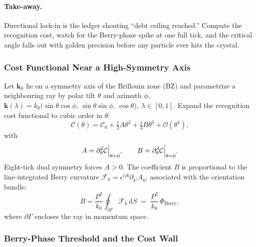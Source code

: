 \documentclass[11pt,oneside]{book}
\begin{document}
\paragraph{Take-away.}
Directional lock-in is the ledger shouting “debt ceiling reached.”
Compute the recognition cost, watch for the Berry-phase spike at one
full tick, and the critical angle falls out with golden precision
before any particle ever hits the crystal.



\subsubsection{Cost Functional Near a High-Symmetry Axis}
\label{ss:lockin-cost-expansion}

Let $\mathbf{k}_{0}$ lie on a symmetry axis of the Brillouin zone
(BZ) and parametrize a neighbouring ray by polar tilt
$\theta$ and azimuth $\phi$,
\(
   \mathbf{k}(\lambda)
   = k_{0}\!\bigl(
       \sin\theta\cos\phi,\,
       \sin\theta\sin\phi,\,
       \cos\theta
     \bigr),
     \ \lambda\in[0,1].
\)
Expand the recognition cost functional to cubic order in $\theta$:
\begin{equation}
   \mathcal C(\theta)
   = \mathcal C_{0}
     + \tfrac12A\theta^{2}
     + \tfrac13B\theta^{3}
     + \mathcal O(\theta^{4}),
   \label{eq:Cexp}
\end{equation}
with
\[
   A
   = \Bigl.
       \partial_{\theta}^{2}\mathcal C
     \Bigr|_{\theta=0},
   \qquad
   B
   = \Bigl.
       \partial_{\theta}^{3}\mathcal C
     \Bigr|_{\theta=0}.
\]
Eight-tick dual symmetry forces $A>0$.  
The coefficient $B$ is proportional to the line-integrated Berry
curvature
$\displaystyle
   \mathcal F_{k}
   = \epsilon^{ijk}
     \partial_{k^{i}}A_{k^{j}}$
associated with the orientation bundle:
\[
   B
   = \frac{P^{2}}{k_{0}}
     \!\oint_{\partial\Gamma}\!
       \mathcal F_{k}\,
       \mathrm dS
     \;=\;
     \frac{P^{2}}{k_{0}}\,
     \Phi_{\text{Berry}},
   \label{eq:Bberry}
\]
where $\partial\Gamma$ encloses the ray in momentum space.

\subsubsection{Berry-Phase Threshold and the Cost Wall}
\label{ss:lockin-berry}
\end{document}
